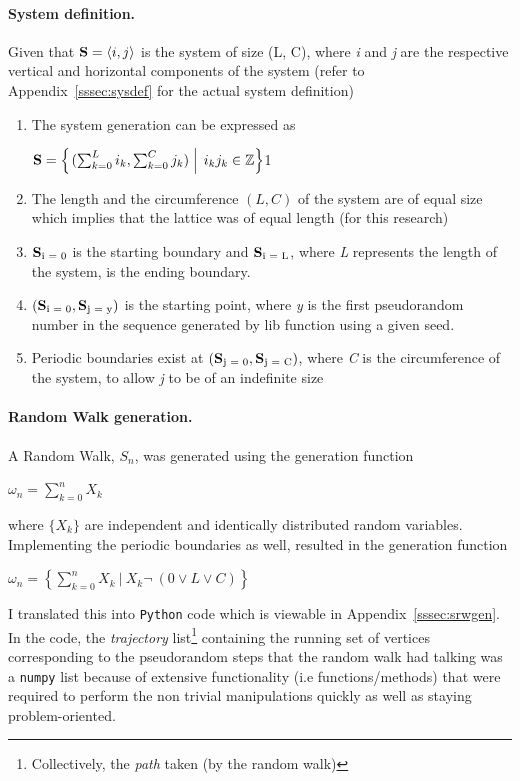 \documentclass{article}
\DeclarePairedDelimiter{\opair}{\langle}{\rangle}
\newcommand\given[1][]{\:#1\vert\:}
\begin{document}
\paragraph{System definition.}\label{subsec:sysfdef} Given that $\vb{S}=\opair{i, j}$ is the system of size (L, C), where \emph{i} and \emph{j} are the respective vertical and horizontal components of the system (refer to Appendix~\ref{sssec:sysdef} for the actual system definition)
	\begin{enumerate}
		\item The system generation can be expressed as
			\begin{center}
				$\vb{S} = \left\{\left. (\sum_{k=0}^L i_k, \sum_{k=0}^C j_k) \; \right\vert \;i_k j_k \in\mathbb{Z} \right\}$1
			\end{center}
		\item The length and the circumference $(L, C)$ of the system are of equal size which implies that the lattice was of equal length (for this research)
		\item $\vb{S}\textsubscript{i = 0}$ is the starting boundary and $\vb{S}\textsubscript{i = L}$, where \emph{L}  represents the length of the system, is the ending boundary.
		\item $(\vb{S}\textsubscript{i = 0}, \vb{S}\textsubscript{j = y})$  is the starting point, where \emph{y} is the first pseudorandom number in the sequence generated by lib function using a given seed.
		\item Periodic boundaries exist at $(\vb{S}\textsubscript{j = 0}, \vb{S}\textsubscript{j = C})$, where \emph{C} is the circumference of the system, to allow \emph{j} to be of an indefinite size
	\end{enumerate}

\paragraph{Random Walk generation.} A Random Walk, $S_{n}$, was generated using the generation function
	\begin{center}
		$\omega_{n} =  \sum_{k=0}^n X_k$
	\end{center}
where $\{X_k\}$ are independent and identically distributed random variables.
Implementing the periodic boundaries as well, resulted in the generation function
\begin{center}
		$\omega_{n} =  \left\{ \sum_{k=0}^n X_k \given[\Big] X_k \lnot\ (0 \lor L \lor C) \right\}$
\end{center}
I translated this into \texttt{Python} code which is viewable in Appendix~\ref{sssec:srwgen}. In the code, the \emph{trajectory} list\footnote{Collectively, the \emph{path} taken (by the random walk)} containing the running set of vertices corresponding to the pseudorandom steps that the random walk had talking was a \texttt{numpy} list because of extensive functionality (i.e functions/methods) that were required to perform the non trivial manipulations quickly as well as staying problem-oriented.
\end{document}
